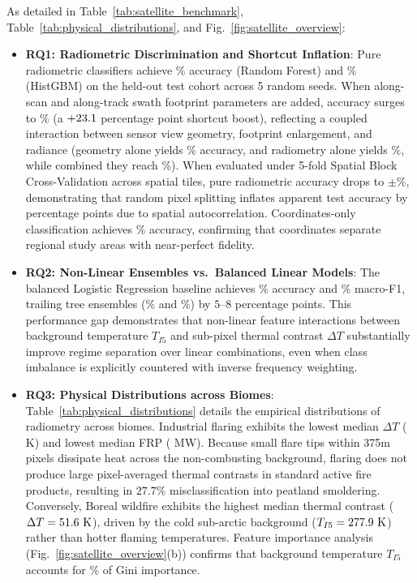 \documentclass[conference]{IEEEtran}
\begin{document}



As detailed in Table~\ref{tab:satellite_benchmark}, Table~\ref{tab:physical_distributions}, and Fig.~\ref{fig:satellite_overview}:
\begin{itemize}
    \item \textbf{RQ1: Radiometric Discrimination and Shortcut Inflation}: Pure radiometric classifiers achieve \accRf{}\% accuracy (Random Forest) and \accHgb{}\% (HistGBM) on the held-out test cohort across 5 random seeds. When along-scan and along-track swath footprint parameters are added, accuracy surges to \accSwathGeom{}\% (a $+23.1{}$ percentage point shortcut boost), reflecting a coupled interaction between sensor view geometry, footprint enlargement, and radiance (geometry alone yields \accGeomOnly{}\% accuracy, and radiometry alone yields \accHgb{}\%, while combined they reach \accSwathGeom{}\%). When evaluated under 5-fold Spatial Block Cross-Validation across \numSpatialTiles{} spatial tiles, pure radiometric accuracy drops to \accSpatialBlockCv{}$\pm$\accSpatialBlockCvStd{}\%, demonstrating that random pixel splitting inflates apparent test accuracy by \spatialLeakageInflation{} percentage points due to spatial autocorrelation. Coordinates-only classification achieves \accCoords{}\% accuracy, confirming that coordinates separate regional study areas with near-perfect fidelity.
    \item \textbf{RQ2: Non-Linear Ensembles vs.\ Balanced Linear Models}: The balanced Logistic Regression baseline achieves \accLogReg{}\% accuracy and \fOneLogReg{}\% macro-F1, trailing tree ensembles (\accRf{}\% and \accHgb{}\%) by $5$--$8$ percentage points. This performance gap demonstrates that non-linear feature interactions between background temperature $T_{I5}$ and sub-pixel thermal contrast $\Delta T$ substantially improve regime separation over linear combinations, even when class imbalance is explicitly countered with inverse frequency weighting.
    \item \textbf{RQ3: Physical Distributions across Biomes}: Table~\ref{tab:physical_distributions} details the empirical distributions of radiometry across biomes. Industrial flaring exhibits the lowest median $\Delta T$ (\flaringDeltaTMed{} K) and lowest median FRP (\flaringFrpMed{} MW). Because small flare tips within 375m pixels dissipate heat across the non-combusting background, flaring does not produce large pixel-averaged thermal contrasts in standard active fire products, resulting in $27.7\%$ misclassification into peatland smoldering. Conversely, Boreal wildfire exhibits the highest median thermal contrast ($\Delta T = 51.6{}\text{ K}$), driven by the cold sub-arctic background ($T_{I5} = 277.9{}\text{ K}$) rather than hotter flaming temperatures. Feature importance analysis (Fig.~\ref{fig:satellite_overview}(b)) confirms that background temperature $T_{I5}$ accounts for \featImpTiFive{}\% of Gini importance.
\end{itemize}
\end{document}
